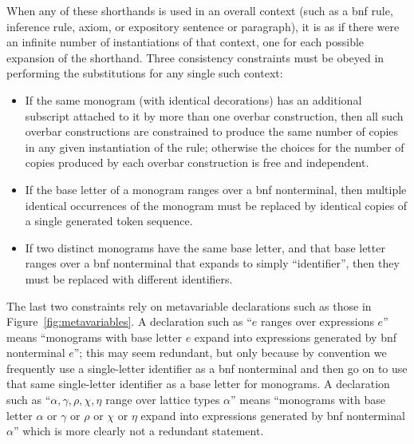 When any of these shorthands is used in an overall context (such as a {\sc bnf} rule, inference rule, axiom, or expository sentence or paragraph), it is as if there were an infinite number of instantiations of that context, one for each possible expansion of the shorthand.  Three consistency constraints must be obeyed in performing the substitutions for any single such context:
\begin{itemize}
\item
If the same monogram (with identical decorations) has an additional subscript attached to it
by more than one overbar construction, then all such overbar constructions are constrained to produce the same number of copies in any given instantiation of the rule;
otherwise the choices for the number of copies produced by each overbar construction is free and independent.
\item
If the base letter of a monogram ranges over a {\sc bnf} nonterminal, then multiple identical occurrences of the monogram must be replaced by identical copies of a single generated token sequence.
\item
If two distinct monograms have the same base letter, and that base letter ranges over a {\sc bnf} nonterminal that expands to simply ``identifier'', then they must be replaced with different identifiers.
\end{itemize}
The last two constraints rely on metavariable declarations such as those in Figure~\ref{fig:metavariables}.  A declaration such as
``$e$ ranges over expressions $e$'' means 
``monograms with base letter $e$ expand into expressions generated by {\sc bnf} nonterminal $e$'';
this may seem redundant, but only because by convention we frequently use a single-letter identifier as a {\sc bnf} nonterminal
and then go on to use that same single-letter identifier as a base letter for monograms.
A declaration such as
``$\alpha, \gamma, \rho, \chi, \eta$ range over lattice types $\alpha$'' means 
``monograms with base letter $\alpha$ or $\gamma$ or $\rho$ or $\chi$ or $\eta$ expand into expressions generated by {\sc bnf} nonterminal $\alpha$''
which is more clearly not a redundant statement.



